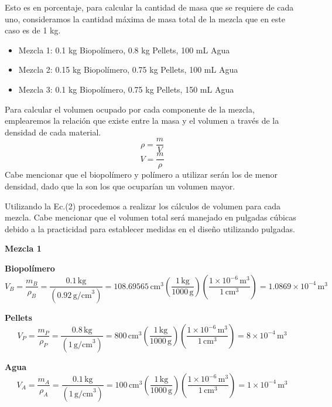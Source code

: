 \documentclass[14pt,oneside]{extarticle} %
\begin{document}
\newpage

Esto es en porcentaje, para calcular la cantidad de masa que se requiere de cada uno, consideramos la cantidad máxima de masa total de la mezcla que en este caso es de 1 kg. 

\begin{itemize}
    \item Mezcla 1: 0.1 kg Biopolímero, 0.8 kg Pellets, 100 mL Agua
    \item Mezcla 2: 0.15 kg Biopolímero, 0.75 kg Pellets, 100 mL Agua
    \item Mezcla 3: 0.1 kg Biopolímero, 0.75 kg Pellets, 150 mL Agua
\end{itemize}
Para calcular el volumen ocupado por cada componente de la mezcla, emplearemos la relación que existe entre la masa y el volumen a través de la densidad de cada material.
\begin{equation}
    \rho=\frac{m}{V}
\end{equation}
\begin{equation}
    V = \frac{m}{\rho}
\end{equation}
Cabe mencionar que el biopolímero y polímero a utilizar serán los de menor densidad, dado que la son los que ocuparían un volumen mayor.

Utilizando la Ec.(2) procedemos a realizar los cálculos de volumen para cada mezcla. Cabe mencionar que el volumen total será manejado en pulgadas cúbicas debido a la practicidad para establecer medidas en el diseño utilizando pulgadas.

\textbf{Mezcla 1}

\textbf{Biopolímero}
\begin{equation*}
V_B = \frac{m_B}{\rho_B} = \frac{0.1\, \text{kg}}{(0.92\, \text{g/cm}^3)} = 108.69565\, \text{cm}^3 \left( \frac{1\, \text{kg}}{1000\, \text{g}} \right) \left( \frac{1\times10^{-6}\, \text{m}^3}{1\, \text{cm}^3} \right) = 1.0869\times10^{-4}\, \text{m}^3
\end{equation*}

\textbf{Pellets}
\begin{equation*}
V_P = \frac{m_P}{\rho_P} = \frac{0.8\, \text{kg}}{(1\, \text{g/cm}^3)} = 800\, \text{cm}^3 \left( \frac{1\, \text{kg}}{1000\, \text{g}} \right) \left( \frac{1\times10^{-6}\, \text{m}^3}{1\, \text{cm}^3} \right) = 8\times10^{-4}\, \text{m}^3
\end{equation*}

\textbf{Agua}
\begin{equation*}
V_A = \frac{m_A}{\rho_A} = \frac{0.1\, \text{kg}}{(1\, \text{g/cm}^3)} = 100\, \text{cm}^3 \left( \frac{1\, \text{kg}}{1000\, \text{g}} \right) \left( \frac{1\times10^{-6}\, \text{m}^3}{1\, \text{cm}^3} \right) = 1\times10^{-4}\, \text{m}^3
\end{equation*}
\end{document}
